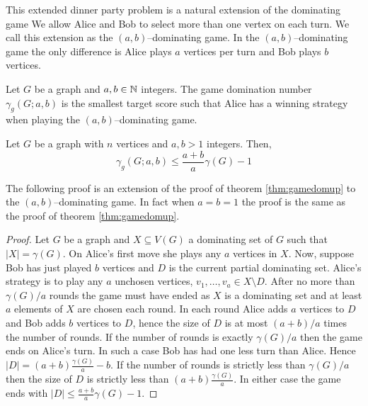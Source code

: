 This extended dinner party problem is a natural extension of the dominating game We allow Alice and Bob to select more than one vertex on each turn. We call this extension as the $(a,b)$--dominating game. In the $(a,b)$--dominating game the only difference is Alice plays $a$ vertices per turn and Bob plays $b$ vertices.

\begin{definition}
    Let $G$ be a graph and $a,b\in\mathbb{N}$ integers. The game domination number $\gamma_g(G;a,b)$ is the smallest target score such that Alice has a winning strategy when playing the $(a,b)$--dominating game.
\end{definition}

\begin{theorem}[Askes] 
    Let $G$ be a graph with $n$ vertices and $a,b>1$ integers. Then,
    \[\gamma_{g}(G;a,b) \leq \frac{a+b}{a}\gamma(G) - 1\]
\end{theorem}
    The following proof is an extension of the proof of theorem \ref{thm:gamedomup} to the $(a,b)$--dominating game. In fact when $a=b=1$ the proof is the same as the proof of theorem \ref{thm:gamedomup}.
\begin{proof}    
   Let $G$ be a graph and $X\subseteq V(G)$ a dominating set of $G$ such that $|X| = \gamma(G)$. On Alice's first move she plays any $a$ vertices in $X$. Now, suppose Bob has just played $b$ vertices and $D$ is the current partial dominating set. Alice's strategy is to play any $a$ unchosen vertices, $v_1,\dots,v_a \in X\setminus D$. After no more than $\gamma(G)/a$ rounds the game must have ended as $X$ is a dominating set and at least $a$ elements of $X$ are chosen each round. In each round Alice adds $a$ vertices to $D$ and Bob adds $b$ vertices to $D$, hence the size of $D$ is at most $(a+b)/a$ times the number of rounds. If the number of rounds is exactly $\gamma(G)/a$ then the game ends on Alice's turn. In such a case Bob has had one less turn than Alice. Hence $|D|=(a+b)\frac{\gamma(G)}{a} -b$. If the number of rounds is strictly less than $\gamma(G)/a$ then the size of $D$ is strictly less than $(a+b)\frac{\gamma(G)}{a}$. In either case the game ends with $|D| \leq \frac{a+b}{a}\gamma(G) - 1$.
\end{proof}













